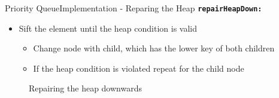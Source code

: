 \begin{frame}{Priority Queue}{Implementation - Reparing the Heap}
  {\color{Mittel-Blau}\texttt{\textbf{repairHeapDown:}}}
  \begin{itemize}
    \item<2->
      {\color{Mittel-Blau}Sift} the element until the
      {\color{Mittel-Blau}heap condition} is valid
      \begin{itemize}
        \item<3->
          Change node with child, which has the lower key of both children
        \item<4->
          If the {\color{Mittel-Blau}heap condition} is violated repeat for
          the child node
      \end{itemize}
  \end{itemize}
   \begin{figure}[!h]%
    \begin{columns}%
      \begin{column}{0.45\linewidth}%
        \begin{adjustbox}{width=\linewidth}%
        \end{adjustbox}%
      \end{column}%
      \begin{column}{0.45\linewidth}%
        \begin{adjustbox}{width=\linewidth}%
        \end{adjustbox}%
      \end{column}%
    \end{columns}%
    \caption{Repairing the heap downwards}%
    \label{fig:priority_queue:impl_repair_heap_down}%
  \end{figure}
\end{frame}


